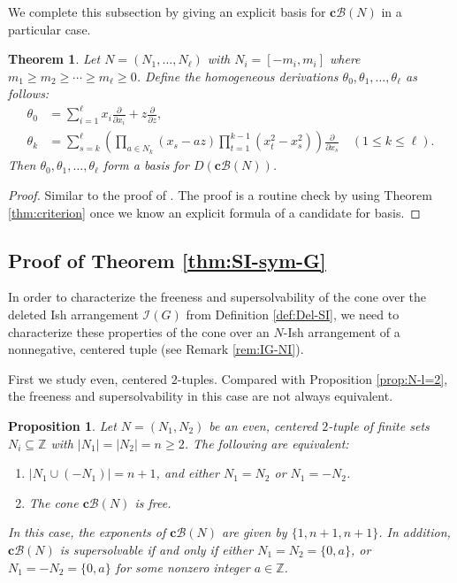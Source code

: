 \documentclass[11pt]{article}
\newtheorem{proposition}[theo]{Proposition}
\newtheorem{theorem}[theo]{Theorem}
\theoremstyle{definition}
\numberwithin{equation}{section}
\newcommand{\I}{\mathcal{I}}
\newcommand{\B}{\mathcal{B}}
\newcommand{\Z}{\mathbb{Z}}
\newcommand{\tbf}{\textbf}
\begin{document}
We complete this subsection by giving an explicit basis for $\tbf{c}\B(N)$ in a particular case.
  \begin{theorem}
 \label{thm:basis}
 Let $N = (N_1, \ldots, N_\ell)$ with $N_i=[-m_i,m_i]$ where $ m_1 \ge m_2 \ge \cdots \ge m_\ell \ge 0$. 
 Define the homogeneous derivations $\theta_0, \theta_1,\ldots, \theta_\ell$ as follows:
  \begin{align*}
\theta_0  & =\sum_{i=1}^\ell x_i \frac{\partial}{\partial x_i} + z\frac{\partial}{\partial z},\\
\theta_k  & =\sum_{s=k}^\ell  \left( \prod_{a \in N_k}(x_s-az) \prod_{t=1}^{k-1}(x_t^2-x_s^2) \right)\frac{\partial}{\partial x_s} \quad (1 \le k \le \ell).
\end{align*}
Then $\theta_0, \theta_1,\ldots, \theta_\ell$ form a basis for  $D(\tbf{c}\B(N))$.
 \end{theorem} 
 \begin{proof}
 Similar to the proof of \cite[Theorem 1.4]{AST17}. 
 The proof is a routine check by using Theorem \ref{thm:criterion} once we know an explicit formula of a candidate for basis. 
 \end{proof} 
 
 
 
 
\subsection{Proof of Theorem  \ref{thm:SI-sym-G}}
\label{subsec:F-SS-G}

In order to characterize the freeness and supersolvability of the cone over the deleted Ish arrangement $\I(G)$ from Definition \ref{def:Del-SI}, we need to characterize these properties of the cone over an $N$-Ish arrangement of a nonnegative, centered tuple (see Remark \ref{rem:IG-NI}).


First we study even, centered $2$-tuples. 
Compared with Proposition \ref{prop:N-l=2}, the freeness and supersolvability in this case are not always equivalent. 
   \begin{proposition}
 \label{prop:N-l=2-relax}
 Let $N = (N_1, N_2)$ be  an even, centered $2$-tuple  of finite sets $N_i \subseteq \Z$ with $|N_1| = |N_2|=n \ge 2$.
 The following are equivalent:
 \begin{enumerate}[(1)]
 \item  $|N_1 \cup (-N_1)|=n+1$, and either  $N_1 =N_2$ or  $N_1=-N_2$. 
\item The cone $\tbf{c}\B(N)$  is  free.
\end{enumerate}
In this case, the exponents of  $\tbf{c}\B(N)$ are given by $\{1, n+1 , n+1\}$. 
In addition, $\tbf{c}\B(N)$ is supersolvable if and only if either $N_1 = N_2 =\{0,a\}$, or  $N_1 = -N_2 =\{0,a\}$ for some nonzero integer $a \in \Z$. 
\end{proposition}
\end{document}

